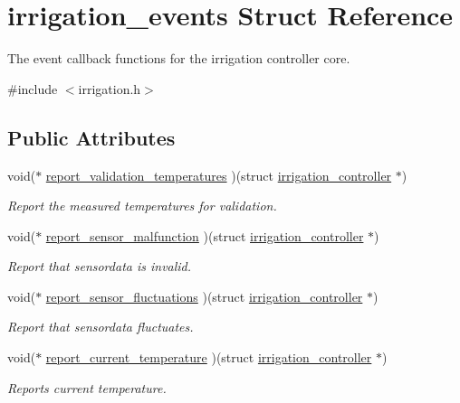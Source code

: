 \hypertarget{structirrigation__events}{}\section{irrigation\+\_\+events Struct Reference}
\label{structirrigation__events}


The event callback functions for the irrigation controller core.  




{\ttfamily \#include $<$irrigation.\+h$>$}

\subsection*{Public Attributes}
\begin{DoxyCompactItemize}
\item 
void($\ast$ \hyperlink{structirrigation__events_acc5d9d31cce6888cab54d32463470f07}{report\+\_\+validation\+\_\+temperatures} )(struct \hyperlink{structirrigation__controller}{irrigation\+\_\+controller} $\ast$)
\begin{DoxyCompactList}\small\item\em Report the measured temperatures for validation. \end{DoxyCompactList}\item 
void($\ast$ \hyperlink{structirrigation__events_abafd6872889e6e54648653f690e61ec6}{report\+\_\+sensor\+\_\+malfunction} )(struct \hyperlink{structirrigation__controller}{irrigation\+\_\+controller} $\ast$)
\begin{DoxyCompactList}\small\item\em Report that sensordata is invalid. \end{DoxyCompactList}\item 
void($\ast$ \hyperlink{structirrigation__events_a41db6d6a624689abdb7be82425ff0b02}{report\+\_\+sensor\+\_\+fluctuations} )(struct \hyperlink{structirrigation__controller}{irrigation\+\_\+controller} $\ast$)
\begin{DoxyCompactList}\small\item\em Report that sensordata fluctuates. \end{DoxyCompactList}\item 
void($\ast$ \hyperlink{structirrigation__events_a47b81edd52377b4c4e1ed512b830e237}{report\+\_\+current\+\_\+temperature} )(struct \hyperlink{structirrigation__controller}{irrigation\+\_\+controller} $\ast$)
\begin{DoxyCompactList}\small\item\em Reports current temperature. \end{DoxyCompactList}\item 

\end{DoxyCompactItemize}
